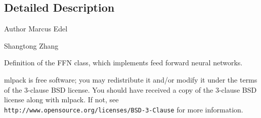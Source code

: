 \subsection{Detailed Description}
\begin{DoxyAuthor}{Author}
Marcus Edel 

Shangtong Zhang
\end{DoxyAuthor}
Definition of the F\+FN class, which implements feed forward neural networks.

mlpack is free software; you may redistribute it and/or modify it under the terms of the 3-\/clause B\+SD license. You should have received a copy of the 3-\/clause B\+SD license along with mlpack. If not, see {\tt http\+://www.\+opensource.\+org/licenses/\+B\+S\+D-\/3-\/\+Clause} for more information. 
